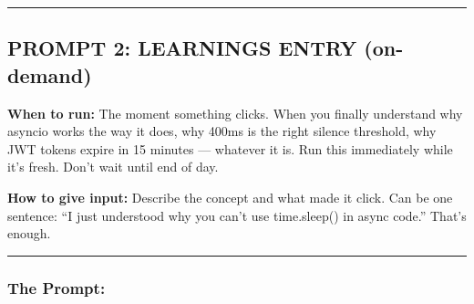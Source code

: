 \documentclass[
  11pt,
]{article}
\begin{document}
\begin{center}\rule{0.5\linewidth}{0.5pt}\end{center}

\hypertarget{prompt-2-learnings-entry-on-demand}{%
\subsection{PROMPT 2: LEARNINGS ENTRY
(on-demand)}\label{prompt-2-learnings-entry-on-demand}}

\textbf{When to run:} The moment something clicks. When you finally
understand why asyncio works the way it does, why 400ms is the right
silence threshold, why JWT tokens expire in 15 minutes --- whatever it
is. Run this immediately while it's fresh. Don't wait until end of day.

\textbf{How to give input:} Describe the concept and what made it click.
Can be one sentence: ``I just understood why you can't use time.sleep()
in async code.'' That's enough.

\begin{center}\rule{0.5\linewidth}{0.5pt}\end{center}

\hypertarget{the-prompt-1}{%
\subsubsection{The Prompt:}\label{the-prompt-1}}
\end{document}
